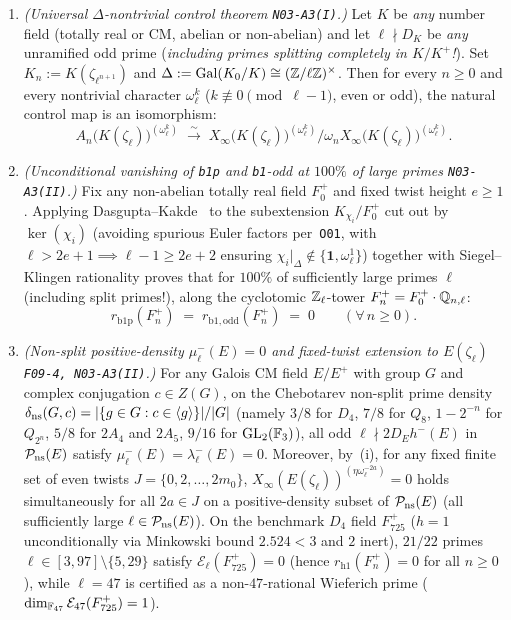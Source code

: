 \begin{theorem}\label{thm:6:delta}
\tagProved{}
\begin{enumerate}[label=\textup{(\roman*)}]
\item \emph{(Universal $\Delta$-nontrivial control theorem \texttt{N03-A3(I)}.)} Let $K$ be \emph{any} number field (totally real or CM, abelian or non-abelian) and let $\ell \nmid D_K$ be \emph{any} unramified odd prime (\emph{including primes splitting completely in $K/K^+$!}). Set $K_n := K(\zeta_{\ell^{n+1}})$ and $\Delta := \mathrm{Gal}(K_0/K) \cong (\mathbb{Z}/\ell\mathbb{Z})^\times$. Then for every $n \ge 0$ and every nontrivial character $\omega_\ell^k$ ($k \not\equiv 0 \pmod{\ell-1}$, even or odd), the natural control map is an isomorphism:
\begin{equation}\label{eq:6:delta-ctrl}
  A_n\bigl(K(\zeta_\ell)\bigr)^{(\omega_\ell^k)} \;\xrightarrow{\;\sim\;}\; X_\infty\bigl(K(\zeta_\ell)\bigr)^{(\omega_\ell^k)} \big/ \omega_n X_\infty\bigl(K(\zeta_\ell)\bigr)^{(\omega_\ell^k)}.
\end{equation}
\item \emph{(Unconditional vanishing of \texttt{b1p} and \texttt{b1}-odd at $100\%$ of large primes \texttt{N03-A3(II)}.)} Fix any non-abelian totally real field $F_0^+$ and fixed twist height $e \ge 1$. Applying Dasgupta--Kakde~\cite{DK2023} to the subextension $K_{\chi_i}/F_0^+$ cut out by $\ker(\chi_i)$ (avoiding spurious Euler factors per~\texttt{O01}, with $\ell > 2e+1 \implies \ell - 1 \ge 2e+2$ ensuring $\chi_i|_\Delta \notin \{\mathbf{1}, \omega_\ell^1\}$) together with Siegel--Klingen rationality proves that for $100\%$ of sufficiently large primes $\ell$ (including split primes!), along the cyclotomic $\mathbb{Z}_\ell$-tower $F_n^+ = F_0^+\cdot \mathbb{Q}_{n,\ell}$:
\[
  r_{\mathrm{b1p}}(F_n^+) \;=\; r_{\mathrm{b1},\mathrm{odd}}(F_n^+) \;=\; 0 \qquad (\forall\, n \ge 0).
\]
\item \emph{(Non-split positive-density $\mu_\ell^-(E) = 0$ and fixed-twist extension to $E(\zeta_\ell)$ \texttt{F09-4, N03-A3(II)}.)} For any Galois CM field $E/E^+$ with group $G$ and complex conjugation $c \in Z(G)$, on the Chebotarev non-split prime density $\delta_{\mathrm{ns}}(G,c) = |\{g \in G : c \in \langle g \rangle\}|/|G|$ (namely $3/8$ for $D_4$, $7/8$ for $Q_8$, $1 - 2^{-n}$ for $Q_{2^n}$, $5/8$ for $2A_4$ and $2A_5$, $9/16$ for $\mathrm{GL}_2(\mathbb{F}_3)$), all odd $\ell \nmid 2 D_E h^-(E)$ in $\mathcal{P}_{\mathrm{ns}}(E)$ satisfy $\mu_\ell^-(E) = \lambda_\ell^-(E) = 0$. Moreover, by~(i), for any fixed finite set of even twists $J = \{0, 2, \dots, 2m_0\}$, $X_\infty(E(\zeta_\ell))^{(\eta\omega_\ell^{-2a})} = 0$ holds simultaneously for all $2a \in J$ on a positive-density subset of $\mathcal{P}_{\mathrm{ns}}(E)$ (all sufficiently large $\ell \in \mathcal{P}_{\mathrm{ns}}(E)$). On the benchmark $D_4$ field $F_{725}^+$ ($h=1$ unconditionally via Minkowski bound $2.524 < 3$ and $2$ inert), $21/22$ primes $\ell \in [3, 97] \setminus \{5, 29\}$ satisfy $\mathcal{E}_\ell(F_{725}^+) = 0$ (hence $r_{\mathrm{h1}}(F_n^+) = 0$ for all $n \ge 0$), while $\ell = 47$ is certified as a non-$47$-rational Wieferich prime ($\dim_{\mathbb{F}_{47}}\mathcal{E}_{47}(F_{725}^+) = 1$).

\end{enumerate}
\end{theorem}

